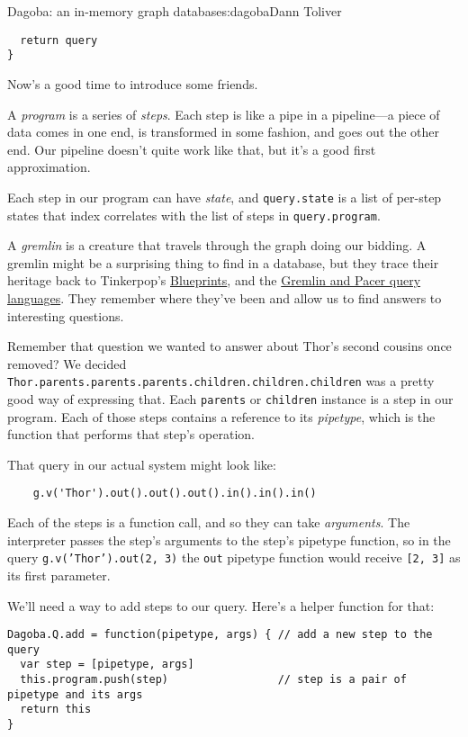 \begin{aosachapter}{Dagoba: an in-memory graph database}{s:dagoba}{Dann Toliver}
\begin{verbatim}
  return query
}
\end{verbatim}

Now's a good time to introduce some friends.

A \emph{program} is a series of \emph{steps}. Each step is like a pipe
in a pipeline---a piece of data comes in one end, is transformed in some
fashion, and goes out the other end. Our pipeline doesn't quite work
like that, but it's a good first approximation.

Each step in our program can have \emph{state}, and \texttt{query.state}
is a list of per-step states that index correlates with the list of
steps in \texttt{query.program}.

A \emph{gremlin} is a creature that travels through the graph doing our
bidding. A gremlin might be a surprising thing to find in a database,
but they trace their heritage back to Tinkerpop's
\href{http://euranova.eu/upl_docs/publications/an-empirical-comparison-of-graph-databases.pdf}{Blueprints},
and the
\href{http://edbt.org/Proceedings/2013-Genova/papers/workshops/a29-holzschuher.pdf}{Gremlin
and Pacer query languages}. They remember where they've been and allow
us to find answers to interesting questions.

Remember that question we wanted to answer about Thor's second cousins
once removed? We decided
\texttt{Thor.parents.parents.parents.children.children.children} was a
pretty good way of expressing that. Each \texttt{parents} or
\texttt{children} instance is a step in our program. Each of those steps
contains a reference to its \emph{pipetype}, which is the function that
performs that step's operation.

That query in our actual system might look like:

\begin{verbatim}
    g.v('Thor').out().out().out().in().in().in()
\end{verbatim}

Each of the steps is a function call, and so they can take
\emph{arguments}. The interpreter passes the step's arguments to the
step's pipetype function, so in the query \texttt{g.v('Thor').out(2, 3)}
the \texttt{out} pipetype function would receive \texttt{{[}2, 3{]}} as
its first parameter.

We'll need a way to add steps to our query. Here's a helper function for
that:

\begin{verbatim}
Dagoba.Q.add = function(pipetype, args) { // add a new step to the query
  var step = [pipetype, args]
  this.program.push(step)                 // step is a pair of pipetype and its args
  return this
}
\end{verbatim}


\end{aosachapter}
